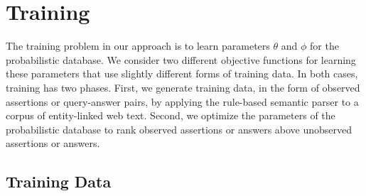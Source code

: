 \documentclass[11pt]{article}
\newcommand{\pred}[1]{\textsc{#1}}
\begin{document}
% 


\section{Training}
\label{sec:training}

The training problem in our approach is to learn parameters $\theta$
and $\phi$ for the probabilistic database. We consider two different
objective functions for learning these parameters that use slightly
different forms of training data. In both cases, training has two
phases. First, we generate training data, in the form of observed
assertions or query-answer pairs, by applying the rule-based semantic
parser to a corpus of entity-linked web text. Second, we optimize the
parameters of the probabilistic database to rank observed assertions
or answers above unobserved assertions or answers.


\subsection{Training Data}
\label{sec:trainingdata}
\end{document}

